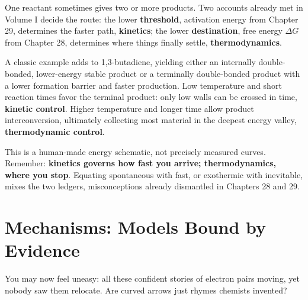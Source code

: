 \begin{qiaoliang}
One reactant sometimes gives two or more products. Two accounts already met in Volume I decide the route: the lower \textbf{threshold}, activation energy from Chapter 29, determines the faster path, \textbf{kinetics}; the lower \textbf{destination}, free energy $\Delta G$ from Chapter 28, determines where things finally settle, \textbf{thermodynamics}.

A classic example adds  to 1,3-butadiene, yielding either an internally double-bonded, lower-energy stable product or a terminally double-bonded product with a lower formation barrier and faster production. Low temperature and short reaction times favor the terminal product: only low walls can be crossed in time, \textbf{kinetic control}. Higher temperature and longer time allow product interconversion, ultimately collecting most material in the deepest energy valley, \textbf{thermodynamic control}.

\begin{center}
\end{center}

This is a human-made energy schematic, not precisely measured curves. Remember: \textbf{kinetics governs how fast you arrive; thermodynamics, where you stop}. Equating spontaneous with fast, or exothermic with inevitable, mixes the two ledgers, misconceptions already dismantled in Chapters 28 and 29.
\end{qiaoliang}

\section{Mechanisms: Models Bound by Evidence}

You may now feel uneasy: all these confident stories of electron pairs moving, yet nobody saw them relocate. Are curved arrows just rhymes chemists invented?

